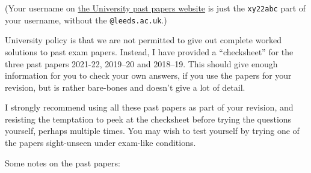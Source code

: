\documentclass[
  letterpaper,
  DIV=11,
  numbers=noendperiod]{scrreprt}
\theoremstyle{remark}
\begin{document}
(Your username on
\href{https://students.leeds.ac.uk/exampapers?action=search\&keyword=MATH1710}{the
University past papers website} is just the \texttt{xy22abc} part of
your username, without the \texttt{@leeds.ac.uk}.)

University policy is that we are not permitted to give out complete
worked solutions to past exam papers. Instead, I have provided a
``checksheet'' for the three past papers 2021-22, 2019--20 and 2018--19.
This should give enough information for you to check your own answers,
if you use the papers for your revision, but is rather bare-bones and
doesn't give a lot of detail.

I strongly recommend using all these past papers as part of your
revision, and resisting the temptation to peek at the checksheet before
trying the questions yourself, perhaps multiple times. You may wish to
test yourself by trying one of the papers sight-unseen under exam-like
conditions.

Some notes on the past papers:
\end{document}
